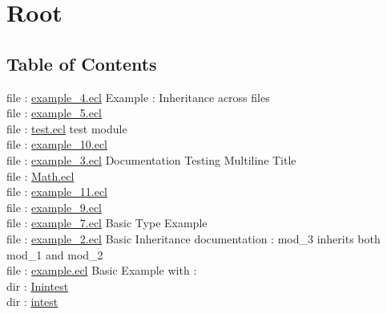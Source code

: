 \chapter*{Root}
\hypertarget{ecldoc:toc:root}{}


\section*{Table of Contents}
file : \hyperlink{ecldoc:toc:example_4}{example\_4.ecl}  Example : Inheritance across files \\
file : \hyperlink{ecldoc:toc:example_5}{example\_5.ecl}   \\
file : \hyperlink{ecldoc:toc:test}{test.ecl}  test module \\
file : \hyperlink{ecldoc:toc:example_10}{example\_10.ecl}   \\
file : \hyperlink{ecldoc:toc:example_3}{example\_3.ecl}  Documentation Testing Multiline Title \\
file : \hyperlink{ecldoc:toc:Math}{Math.ecl}   \\
file : \hyperlink{ecldoc:toc:example_11}{example\_11.ecl}   \\
file : \hyperlink{ecldoc:toc:example_9}{example\_9.ecl}   \\
file : \hyperlink{ecldoc:toc:example_7}{example\_7.ecl}  Basic Type Example \\
file : \hyperlink{ecldoc:toc:example_2}{example\_2.ecl}  Basic Inheritance documentation : mod\_3 inherits both mod\_1 and mod\_2 \\
file : \hyperlink{ecldoc:toc:example}{example.ecl}  Basic Example with : \\
dir : \hyperlink{ecldoc:toc:Inintest}{Inintest}   \\
dir : \hyperlink{ecldoc:toc:intest}{intest}   \\














